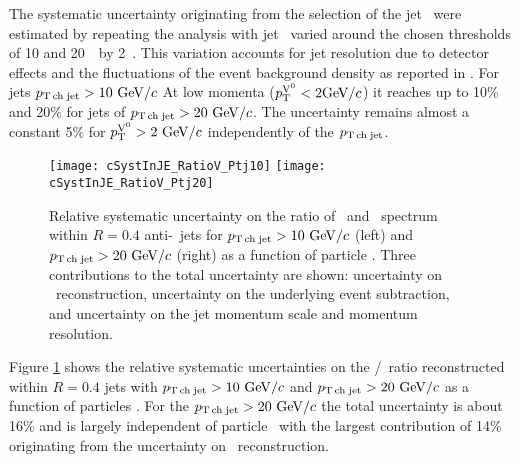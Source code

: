 

The systematic uncertainty originating from the selection of the jet \pt\ were estimated by repeating the analysis with jet \pt\ varied around the chosen thresholds of 10 and 20~\gevc\ by 2~\gevc. 
This variation accounts for jet resolution due to detector effects and the fluctuations of the event background density as reported in \cite{Adam:2015hoa}. 
For jets $p_\mathrm{T\,ch\;jet}>10~\mathrm{GeV}/c$ At low momenta ($ p_{\mathrm{T}}^{{\rm V}^{0}} <2\mathrm{GeV}/c$) it reaches up to 10\% and 20\% for jets of $p_\mathrm{T\,ch\;jet}>20~\mathrm{GeV}/c$. The uncertainty remains almost a constant 5\% for $ p_{\mathrm{T}}^{{\rm V}^{0}}  > 2~\mathrm{GeV}/c$ independently of the $p_\mathrm{T\,ch\;jet}$. 

\begin{figure}[htbp]
	\centering
	\texttt{[image: cSystInJE\_RatioV\_Ptj10]}
	\texttt{[image: cSystInJE\_RatioV\_Ptj20]}
	\caption{Relative systematic uncertainty on the ratio of \lda\ and \ks\ spectrum within $R=0.4$ anti-\kt\ jets for $p_\mathrm{T\,ch\;jet}>10~\mathrm{GeV}/c$ (left) and $p_\mathrm{T\,ch\;jet}>20~\mathrm{GeV}/c$ (right) as a function of particle \pt. Three contributions to the total uncertainty are shown: uncertainty on \vzero\ reconstruction, uncertainty on the underlying event subtraction, and uncertainty on the jet momentum scale and momentum resolution. }
	\label{fig:systUncertRatio}
\end{figure}

Figure \ref{fig:systUncertRatio} shows the relative systematic uncertainties on the \lda/\ks\ ratio reconstructed within $R=0.4$ jets with $p_\mathrm{T\,ch\;jet} > 10~\mathrm{GeV}/c$ and $p_\mathrm{T\,ch\;jet} > 20~\mathrm{GeV}/c$ as a function of particles \pt. 
For the $p_\mathrm{T\,ch\;jet} > 20~\mathrm{GeV}/c$ the total uncertainty is about 16\% and is largely independent of particle \pt\ with the largest contribution of 14\% originating from the uncertainty on \Vzero\ reconstruction.



